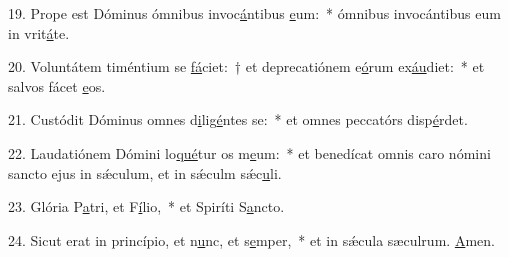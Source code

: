 19. Prope est Dóminus ómnibus invoc\uline{á}ntibus \uline{e}um:~* ómnibus invocántibus eum in vrit\uline{á}te.\par 
20. Voluntátem timéntium se \uline{fá}ciet:~† et deprecatiónem e\uline{ó}rum ex\uline{áu}diet:~* et salvos fácet \uline{e}os.\par 
21. Custódit Dóminus omnes d\uline{i}lig\uline{é}ntes se:~* et omnes peccatórs disp\uline{é}rdet.\par 
22. Laudatiónem Dómini lo\uline{qué}tur os m\uline{e}um:~* et benedícat omnis caro nómini sancto ejus in sǽculum, et in sǽculm sǽc\uline{u}li.\par 
23. Glória P\uline{a}tri, et F\uline{í}lio,~* et Spiríti S\uline{a}ncto.\par 
24. Sicut erat in princípio, et n\uline{u}nc, et s\uline{e}mper,~* et in sǽcula sæculrum. \uline{A}men.\par 
